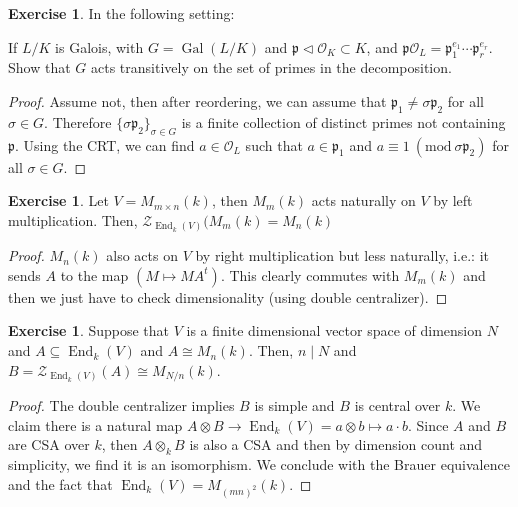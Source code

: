 \documentclass{tufte-handout} %
\theoremstyle{definition}
\newtheorem{exer}[thm]{Exercise}
\theoremstyle{remark}
\newcommand{\Mod}[1]{\ (\text{mod}\ #1)}
\newcommand{\mZ}{\mathcal{Z}}
\newcommand{\mO}{\mathcal{O}}
\newcommand{\lp}{{\mathfrak{p}}}
\DeclareMathOperator{\gal}{Gal}
\DeclareMathOperator{\End}{End}
\begin{document}
\begin{exer}
In the following setting:
\begin{figure}
\end{figure}
If $L/K$ is Galois, with $G = \gal(L/K)$ and $\lp \lhd \mO_K \subset K$, and $\lp \mO_L = \lp_1^{e_1}\cdots \lp_r^{e_r}$. Show that $G$ acts transitively on the set of primes in the decomposition.
\end{exer}
\begin{proof}
	Assume not, then after reordering, we can assume that $\lp_1 \neq \sigma \lp_2$ for all $\sigma \in G$. Therefore $\{\sigma \lp_2\}_{\sigma \in G}$ is a finite collection of distinct primes not containing $\lp$. Using the CRT, we can find $a \in \mO_L$ such that $a \in \lp_1$ and $a \equiv 1 \Mod{\sigma \lp_2}$ for all $\sigma \in G$.
\end{proof}
\begin{exer}
	Let $V= M_{m\times n}(k)$, then $M_m(k)$ acts naturally on $V$ by left multiplication. Then, $\mZ_{\End_k(V)}(M_m(k) = M_n(k)$
\end{exer}
\begin{proof}
	$M_n(k)$ also acts on $V$ by right multiplication but less naturally, i.e.: it sends $A$ to the map $(M \mapsto MA^{t})$. This clearly commutes with $M_m(k)$ and then we just have to check dimensionality (using double centralizer).
\end{proof}
\begin{exer}
	Suppose that $V$ is a finite dimensional vector space of dimension $N$ and $A \subseteq \End_k(V)$ and $A \cong M_n(k)$. Then, $n \mid N$ and $B = \mZ_{\End_k(V)}(A) \cong M_{N/n}(k)$.
\end{exer}
\begin{proof}
	The double centralizer implies $B$ is simple and $B$ is central over $k$. We claim there is a natural map $A\otimes B \rightarrow \End_k(V) = a\otimes b \mapsto a\cdot b$. Since $A$ and $B$ are CSA over $k$, then $A \otimes_kB$ is also a CSA and then by dimension count and simplicity, we find it is an isomorphism. We conclude with the Brauer equivalence and the fact that $\End_k(V) = M_{(mn)^2}(k)$.
\end{proof}
\end{document}
